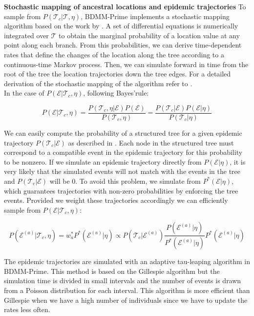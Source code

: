 \textbf{Stochastic mapping of ancestral locations and epidemic trajectories}
To sample from $P(\mathcal{T}_c|\mathcal{T}, \eta)$, BDMM-Prime implements a stochastic mapping algorithm based on the work by \cite{Hohna2019}. A set of differential equations is numerically integrated over $\mathcal{T}$ to obtain the marginal probability of a location value at any point along each branch. From this probabilities, we can derive time-dependent rates that define the changes of the location along the tree according to a continuous-time Markov process. Then, we can simulate forward in time from the root of the tree the location trajectories down the tree edges. For a detailed derivation of the stochastic mapping of the algorithm refer to \cite{VaughanWIP}.\\

In the case of $P(\mathcal{E}|\mathcal{T}_c, \eta)$, following Bayes'rule:

\begin{equation}
P(\mathcal{E}|\mathcal{T}_c, \eta) = \frac{P(\mathcal{T}_c, \eta|\mathcal{E}) P(\mathcal{E})}{P(\mathcal{T}_c, \eta)} = \frac{P(\mathcal{T}_c|\mathcal{E}) P(\mathcal{E}| \eta)}{P(\mathcal{T}_c | \eta)}
\label{trajectories}
\end{equation}

We can easily compute the probability of a structured tree for a given epidemic trajectory $P(\mathcal{T}_c|\mathcal{E})$ as described in \cite{Vaughan2019}. Each node in the structured tree must correspond to a compatible event in the epidemic trajectory for this probability to be nonzero. If we simulate an epidemic trajectory directly from $P(\mathcal{E}| \eta)$, it is very likely that the simulated events will not match with the events in the tree and $P(\mathcal{T}_c|\mathcal{E})$ will be 0. To avoid this problem, we simulate from $P^*(\mathcal{E}| \eta)$, which guarantees trajectories with non-zero probabilities by enforcing the tree events. Provided we weight these trajectories accordingly we can efficiently sample from $P(\mathcal{E}|\mathcal{T}_c, \eta)$:

\begin{equation}
P(\mathcal{E}^{(a)}|\mathcal{T}_c, \eta) = w_a^* P^*(\mathcal{E}^{(a)}| \eta) \propto P(\mathcal{T}_c | \mathcal{E}^{(a)}) \frac{P(\mathcal{E}^{(a)} | \eta)}{P^*(\mathcal{E}^{(a)} | \eta)} P^*(\mathcal{E}^{(a)}| \eta)
\label{eq:traj}
\end{equation}

The epidemic trajectories are simulated with an adaptive tau-leaping algorithm \cite{Gillespie2000} in BDMM-Prime. This method is based on the Gillespie algorithm \cite{Gillespie1977} but the simulation time is divided in small intervals and the number of events is drawn from a Poisson distribution for each interval. This algorithm is more efficient than Gillespie when we have a high number of individuals since we have to update the rates less often. 

